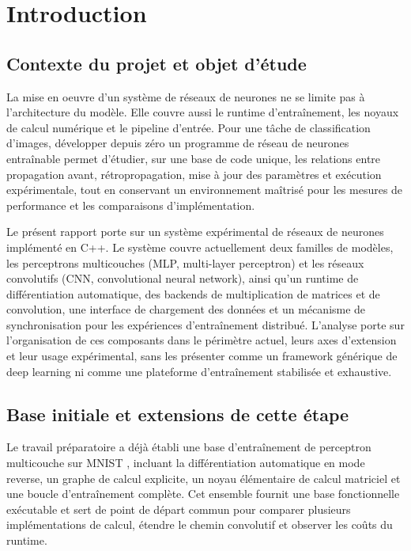 \documentclass[a4paper,11pt,oneside]{article}
\begin{document}
\clearpage
\hypersetup{pageanchor=true}
\setcounter{page}{1}
\tableofcontents
\clearpage
{}
\setcounter{page}{1}
\pagestyle{fancy}
\thispagestyle{plain}

\section{Introduction}

\subsection{Contexte du projet et objet d'étude}
La mise en oeuvre d'un système de réseaux de neurones ne se limite pas à l'architecture du modèle. Elle couvre aussi le runtime d'entraînement, les noyaux de calcul numérique et le pipeline d'entrée. Pour une tâche de classification d'images, développer depuis zéro un programme de réseau de neurones entraînable permet d'étudier, sur une base de code unique, les relations entre propagation avant, rétropropagation, mise à jour des paramètres et exécution expérimentale, tout en conservant un environnement maîtrisé pour les mesures de performance et les comparaisons d'implémentation.

Le présent rapport porte sur un système expérimental de réseaux de neurones implémenté en C++. Le système couvre actuellement deux familles de modèles, les perceptrons multicouches (MLP, multi-layer perceptron) et les réseaux convolutifs (CNN, convolutional neural network), ainsi qu'un runtime de différentiation automatique, des backends de multiplication de matrices et de convolution, une interface de chargement des données et un mécanisme de synchronisation pour les expériences d'entraînement distribué. L'analyse porte sur l'organisation de ces composants dans le périmètre actuel, leurs axes d'extension et leur usage expérimental, sans les présenter comme un framework générique de deep learning ni comme une plateforme d'entraînement stabilisée et exhaustive.

\subsection{Base initiale et extensions de cette étape}
Le travail préparatoire a déjà établi une base d'entraînement de perceptron multicouche sur MNIST \cite{lecun1998}, incluant la différentiation automatique en mode reverse, un graphe de calcul explicite, un noyau élémentaire de calcul matriciel et une boucle d'entraînement complète. Cet ensemble fournit une base fonctionnelle exécutable et sert de point de départ commun pour comparer plusieurs implémentations de calcul, étendre le chemin convolutif et observer les coûts du runtime.
\end{document}
